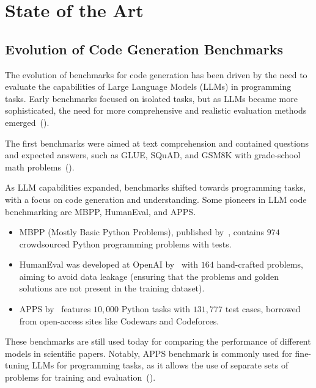 

\section{State of the Art}


\subsection{Evolution of Code Generation Benchmarks}

The evolution of benchmarks for code generation has been driven by the need to evaluate the capabilities of Large Language Models (LLMs) in programming tasks.
Early benchmarks focused on isolated tasks, but as LLMs became more sophisticated, the need for more comprehensive and realistic evaluation methods emerged~(\cite{paul2024benchmarksmetricsevaluationscode}).

The first benchmarks were aimed at text comprehension and contained questions and expected answers, such as GLUE, SQuAD, and GSM8K with grade-school math problems~(\cite{vendrow2025largelanguagemodelbenchmarks}).

As LLM capabilities expanded, benchmarks shifted towards programming tasks, with a focus on code generation and understanding.
Some pioneers in LLM code benchmarking are MBPP, HumanEval, and APPS.

\begin{itemize}
\item MBPP (Mostly Basic Python Problems), published by~\cite{austin2021program}, contains $974$ crowdsourced Python programming problems with tests.

\item HumanEval was developed at OpenAI by~\cite{chen2021evaluatinglargelanguagemodels} with $164$ hand-crafted problems, aiming to avoid data leakage (ensuring that the problems and golden solutions are not present in the training dataset).

\item APPS by~\cite{hendrycksapps2021} features $10,000$ Python tasks with $131,777$ test cases, borrowed from open-access sites like Codewars and Codeforces.
\end{itemize}
These benchmarks are still used today for comparing the performance of different models in scientific papers.
Notably, APPS benchmark is commonly used for fine-tuning LLMs for programming tasks, as it allows the use of separate sets of problems for training and evaluation~(\cite{bigcode-evaluation-harness}).

